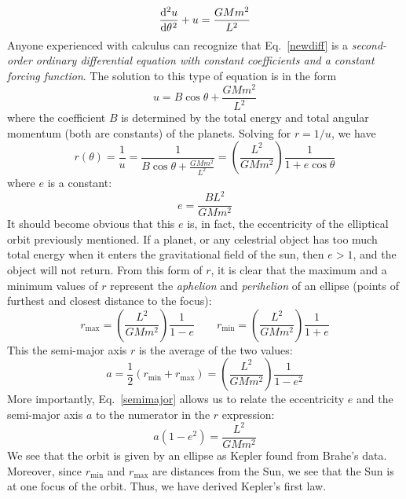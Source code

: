 \documentclass{../../oss-handout}
\begin{document}
\begin{equation}
  \diff[2]u\theta + u = \frac{GMm^2}{L^2}
  \label{newdiff}
\end{equation}
Anyone experienced with calculus can recognize that Eq.\ \ref{newdiff} is a
\emph{second-order ordinary differential equation with constant coefficients
  and a constant forcing function}. The solution to this type of equation is in
the form
\begin{equation} 
  u =B\cos\theta + \frac{GMm^2}{L^2}
\end{equation}
where the coefficient $B$ is determined by the total energy and total angular
momentum (both are constants) of the planets. Solving for $r=1/u$, we have
\begin{equation}
  r(\theta)=\frac1u = \frac1{B\cos\theta+ \frac{GMm^2}{L^2}}
  =\left(\frac{L^2}{GMm^2}\right)\frac1{1+e\cos\theta}
\end{equation}
where $e$ is a constant:
\begin{equation}
  e=\dfrac{BL^2}{GMm^2}
\end{equation}
It should become obvious that this $e$ is, in fact, the eccentricity of the
elliptical orbit previously mentioned. If a planet, or any celestrial object
has too much total energy when it enters the gravitational field of the sun,
then $e>1$, and the object will not return.
From this form of $r$, it is clear that the maximum and a
minimum values of $r$ represent the \emph{aphelion} and \emph{perihelion} of
an ellipse (points of furthest and closest distance to the focus):
\begin{equation}
  r_\text{max}=\left(\frac{L^2}{GMm^2}\right)\frac1{1-e}
  \quad\quad
  r_\text{min}=\left(\frac{L^2}{GMm^2}\right)\frac1{1+e}
\end{equation}
This the semi-major axis $r$ is the average of the two values:
\begin{equation}
  a=\dfrac12\left(r_\text{min} + r_\text{max}\right)=
  \left(\frac{L^2}{GMm^2}\right)\frac1{1-e^2}
  \label{semimajor}
\end{equation}
More importantly, Eq.\ \ref{semimajor} allows us to relate the eccentricity
$e$ and the semi-major axis $a$ to the numerator in the $r$ expression:
\begin{equation}
  a(1-e^2)=\frac{L^2}{GMm^2}
  \label{eq:numerator}
\end{equation}
We see that the orbit is given by an ellipse as Kepler found from Brahe's
data. Moreover, since $r_\mathrm{min}$ and $r_\mathrm{max}$ are distances from
the Sun, we see that the Sun is at one focus of the orbit. Thus, we have
derived Kepler's first law.
\end{document}
